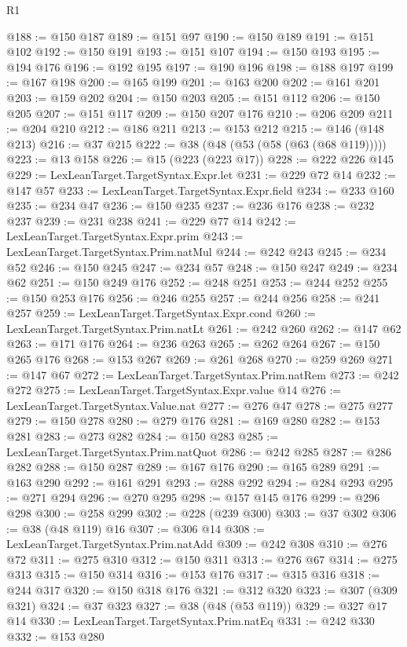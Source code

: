 \begin{lexlean}{R1}
\begin{coremodule}
@188 := @150 @187
@189 := @151 @97
@190 := @150 @189
@191 := @151 @102
@192 := @150 @191
@193 := @151 @107
@194 := @150 @193
@195 := @194 @176
@196 := @192 @195
@197 := @190 @196
@198 := @188 @197
@199 := @167 @198
@200 := @165 @199
@201 := @163 @200
@202 := @161 @201
@203 := @159 @202
@204 := @150 @203
@205 := @151 @112
@206 := @150 @205
@207 := @151 @117
@209 := @150 @207 @176
@210 := @206 @209
@211 := @204 @210
@212 := @186 @211
@213 := @153 @212
@215 := @146 (@148 @213)
@216 := @37 @215
@222 := @38 (@48 (@53 (@58 (@63 (@68 @119)))))
@223 := @13 @158
@226 := @15 (@223 (@223 @17))
@228 := @222 @226 @145
@229 := LexLeanTarget.TargetSyntax.Expr.let
@231 := @229 @72 @14
@232 := @147 @57
@233 := LexLeanTarget.TargetSyntax.Expr.field
@234 := @233 @160
@235 := @234 @47
@236 := @150 @235
@237 := @236 @176
@238 := @232 @237
@239 := @231 @238
@241 := @229 @77 @14
@242 := LexLeanTarget.TargetSyntax.Expr.prim
@243 := LexLeanTarget.TargetSyntax.Prim.natMul
@244 := @242 @243
@245 := @234 @52
@246 := @150 @245
@247 := @234 @57
@248 := @150 @247
@249 := @234 @62
@251 := @150 @249 @176
@252 := @248 @251
@253 := @244 @252
@255 := @150 @253 @176
@256 := @246 @255
@257 := @244 @256
@258 := @241 @257
@259 := LexLeanTarget.TargetSyntax.Expr.cond
@260 := LexLeanTarget.TargetSyntax.Prim.natLt
@261 := @242 @260
@262 := @147 @62
@263 := @171 @176
@264 := @236 @263
@265 := @262 @264
@267 := @150 @265 @176
@268 := @153 @267
@269 := @261 @268
@270 := @259 @269
@271 := @147 @67
@272 := LexLeanTarget.TargetSyntax.Prim.natRem
@273 := @242 @272
@275 := LexLeanTarget.TargetSyntax.Expr.value @14
@276 := LexLeanTarget.TargetSyntax.Value.nat
@277 := @276 @47
@278 := @275 @277
@279 := @150 @278
@280 := @279 @176
@281 := @169 @280
@282 := @153 @281
@283 := @273 @282
@284 := @150 @283
@285 := LexLeanTarget.TargetSyntax.Prim.natQuot
@286 := @242 @285
@287 := @286 @282
@288 := @150 @287
@289 := @167 @176
@290 := @165 @289
@291 := @163 @290
@292 := @161 @291
@293 := @288 @292
@294 := @284 @293
@295 := @271 @294
@296 := @270 @295
@298 := @157 @145 @176
@299 := @296 @298
@300 := @258 @299
@302 := @228 (@239 @300)
@303 := @37 @302
@306 := @38 (@48 @119) @16
@307 := @306 @14
@308 := LexLeanTarget.TargetSyntax.Prim.natAdd
@309 := @242 @308
@310 := @276 @72
@311 := @275 @310
@312 := @150 @311
@313 := @276 @67
@314 := @275 @313
@315 := @150 @314
@316 := @153 @176
@317 := @315 @316
@318 := @244 @317
@320 := @150 @318 @176
@321 := @312 @320
@323 := @307 (@309 @321)
@324 := @37 @323
@327 := @38 (@48 (@53 @119))
@329 := @327 @17 @14
@330 := LexLeanTarget.TargetSyntax.Prim.natEq
@331 := @242 @330
@332 := @153 @280

\end{coremodule}
\end{lexlean}
